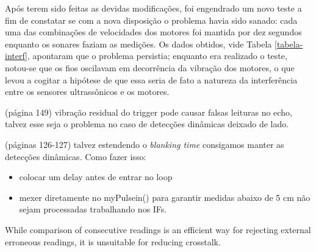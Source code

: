 Após terem sido feitas as devidas modificações, foi engendrado um novo teste a fim de constatar se com a nova disposição o problema havia sido 
sanado: cada uma das combinações de velocidades dos motores foi mantida por dez segundos enquanto os sonares faziam as medições.
Os dados obtidos, vide Tabela \ref{tabela-interf}, apontaram que o problema persistia; enquanto era realizado o teste, notou-se que os fios oscilavam
 em decorrência da vibração dos motores, o que levou a cogitar a hipótese de que essa seria de fato a natureza da interferência entre os sensores 
ultrassônicos e os motores.

\cite{jones}(página 149) vibração residual do trigger pode causar falsas leituras no echo, talvez esse seja o problema no caso de detecções dinâmicas 
deixado de lado.

\cite{siegwart} (páginas 126-127) talvez estendendo o \textit{blanking time} consigamos manter as detecções dinâmicas. Como fazer isso:
\begin{itemize}
 \item colocar um delay antes de entrar no loop
 \item mexer diretamente no myPulsein() para garantir medidas abaixo de 5 cm não sejam processadas trabalhando nos IFs. 
\end{itemize}

 While comparison of consecutive readings is an efficient way for rejecting external
 erroneous readings, it is unsuitable for reducing crosstalk. \cite{2016_artigo_1}

